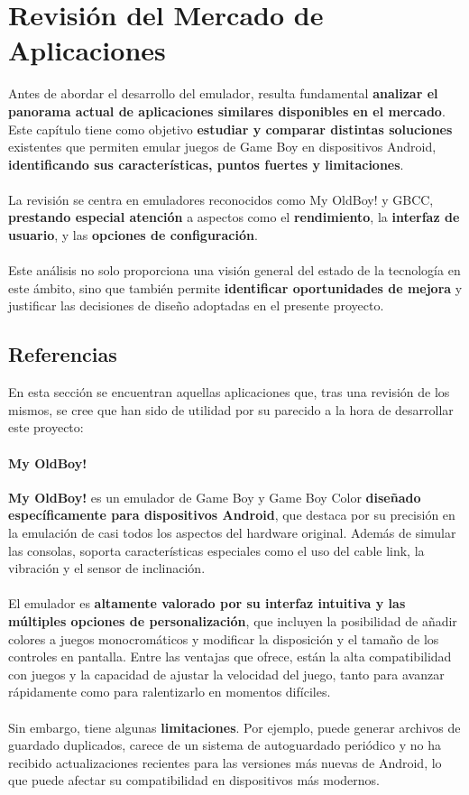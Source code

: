 \chapter{Revisión del Mercado de Aplicaciones}
\label{chap:mercado}

Antes de abordar el desarrollo del emulador, resulta fundamental \textbf{analizar el panorama actual de aplicaciones similares disponibles en el mercado}. Este capítulo tiene como objetivo \textbf{estudiar y comparar distintas soluciones} existentes que permiten emular juegos de Game Boy en dispositivos Android, \textbf{identificando sus características, puntos fuertes y limitaciones}.
\\\\
La revisión se centra en emuladores reconocidos como My OldBoy! y GBCC, \textbf{prestando especial atención} a aspectos como el \textbf{rendimiento}, la \textbf{interfaz de usuario}, y las \textbf{opciones de configuración}.
\\\\
Este análisis no solo proporciona una visión general del estado de la tecnología en este ámbito, sino que también permite \textbf{identificar oportunidades de mejora} y justificar las decisiones de diseño adoptadas en el presente proyecto.

\section{Referencias}
En esta sección se encuentran aquellas aplicaciones que, tras una revisión de los mismos, se cree que han sido de utilidad por su parecido a la hora de desarrollar este proyecto:

\subsubsection{My OldBoy!}

\textbf{My OldBoy!} es un emulador de Game Boy y Game Boy Color \textbf{diseñado específicamente para dispositivos Android}, que destaca por su precisión en la emulación de casi todos los aspectos del hardware original. Además de simular las consolas, soporta características especiales como el uso del cable link, la vibración y el sensor de inclinación.
\\\\
El emulador es \textbf{altamente valorado por su interfaz intuitiva y las múltiples opciones de personalización}, que incluyen la posibilidad de añadir colores a juegos monocromáticos y modificar la disposición y el tamaño de los controles en pantalla. Entre las ventajas que ofrece, están la alta compatibilidad con juegos y la capacidad de ajustar la velocidad del juego, tanto para avanzar rápidamente como para ralentizarlo en momentos difíciles.
\\\\
Sin embargo, tiene algunas \textbf{limitaciones}. Por ejemplo, puede generar archivos de guardado duplicados, carece de un sistema de autoguardado periódico y no ha recibido actualizaciones recientes para las versiones más nuevas de Android, lo que puede afectar su compatibilidad en dispositivos más modernos.

